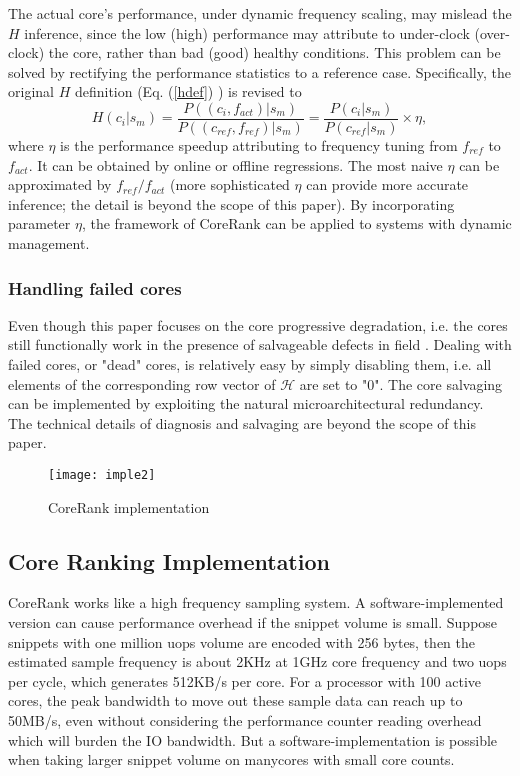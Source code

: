 The actual core's performance, under dynamic  frequency scaling, may mislead the $H$ inference, since the low (high) performance may attribute to under-clock (over-clock) the core, rather than bad (good) healthy conditions. This problem can be solved by rectifying the performance statistics to a reference case.   Specifically, the original $H$ definition (Eq. (\ref{hdef}) ) is revised to
\begin{equation}
  H(c_i|s_m) = \frac{P((c_i, f_{act})|s_m)}{P((c_{ref}, f_{ref})|s_m)} =  \frac{P(c_i|s_m)}{P(c_{ref}|s_m)} \times \eta,
\end{equation}
where $\eta$ is the performance speedup attributing to frequency tuning from $f_{ref}$ to $f_{act}$. It can be obtained by online \cite{AgileRegulator}  or offline regressions.   The most naive $\eta$ can be approximated by  $ f_{ref} /f_{act}$ (more sophisticated $\eta$ can provide more accurate inference; the detail is beyond the scope of this paper).  By incorporating parameter $\eta$,  the framework of CoreRank can be applied to systems with dynamic management.  


\subsubsection{Handling failed cores}
Even though this paper focuses on the core progressive degradation, i.e. the cores still functionally work in the presence of salvageable defects in field \cite{salvaging}. Dealing with failed cores, or "dead" cores,  is relatively easy by simply disabling them, i.e. all elements of the corresponding row vector of $\mathcal{H}$ are set to "0". The core salvaging can be implemented by exploiting the natural microarchitectural redundancy. The technical details of diagnosis \cite{diagnosis}\cite{trace-based-diagnosis}\cite{mswat} and salvaging \cite{salvaging}\cite{exploiting-redundancy} are beyond the scope of this paper.

\begin{figure*}[t]
  \centering
  \texttt{[image: imple2]}\\
  \caption{CoreRank implementation}\label{flow}
\end{figure*}

\subsection{Core Ranking Implementation}
CoreRank works like a high frequency sampling system. A software-implemented version can cause performance overhead  if the snippet volume is small. Suppose snippets with one million uops volume are encoded with 256 bytes, then the estimated sample frequency is about 2KHz at 1GHz core frequency and two uops per cycle, which generates 512KB/s per core. For a processor with 100 active cores, the peak bandwidth to move out these sample data can reach up to 50MB/s, even without considering the performance counter reading overhead which will burden the IO bandwidth. But a software-implementation is possible when taking larger snippet volume on manycores with small core counts.

